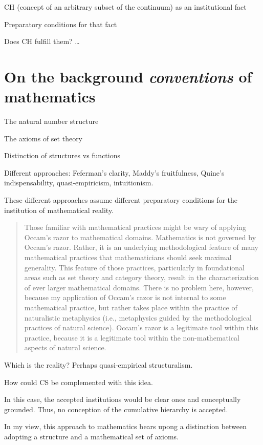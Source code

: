 \documentclass[11pt,a4paper]{article}
\begin{document}
CH (concept of an arbitrary subset of the continuum) as an institutional fact 

Preparatory conditions for that fact 

Does CH fulfill them? … 

\section{On the background \textit{conventions} of mathematics}

The natural number structure

The axioms of set theory

Distinction of structures vs functions

Different approaches: Feferman's clarity, Maddy's fruitfulness, Quine's indispensability, quasi-empiricism, intuitionism.

These different approaches assume different preparatory conditions for the institution of mathematical reality. 

\begin{quote}
Those familiar with mathematical practices might be wary of applying Occam's razor to mathematical domains. Mathematics is not governed by Occam's razor. Rather, it is an underlying methodological feature of many mathematical practices that mathematicians should seek maximal generality. This feature of those practices, particularly in foundational areas such as set theory and category theory, result in the characterization of ever larger mathematical domains. There is no problem here, however, because my application of Occam's razor is not internal to some mathematical practice, but rather takes place within the practice of naturalistic metaphysics (i.e., metaphysics guided by the methodological practices of natural science). Occam's razor is a legitimate tool within this practice, because it is a legitimate tool within the non-mathematical aspects of natural science.\parencite[128]{Cole2008MathematicalDomains}
\end{quote}

Which is the reality? Perhaps quasi-empirical structuralism.

How could CS be complemented with this idea.

In this case, the accepted institutions would be clear ones and conceptually grounded. Thus, no conception of the cumulative hierarchy is accepted.

In my view, this approach to mathematics bears upong a distinction between adopting a structure and a mathematical set of axioms.
\end{document}
